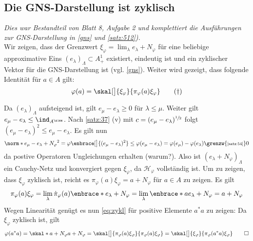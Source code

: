 \subsection{Die GNS-Darstellung ist zyklisch} %
\label{sub:gns_zyklisch}
\emph{Dies war Bestandteil von Blatt 8, Aufgabe 2 und komplettiert die Ausführungen zur GNS-Darstellung in \autoref{gns} und \autoref{satz:512}).} \smallskip \\
Wir zeigen, dass der Grenzwert $\xi_\varphi = \lim_\lambda e_\lambda + N_\varphi$ für eine beliebige approximative Eins $(e_\lambda)_\Lambda \subset A^1_+$ existiert, eindeutig ist und ein zyklischer Vektor für die GNS-Darstellung ist (vgl. \autoref{gns}).
Weiter wird gezeigt, dass folgende Identität für $a \in A$ gilt:
\begin{equation}
	\varphi(a) = \skal[\big]{\xi_\varphi}{\pi_\varphi(a)\xi_\varphi}
	\label{eq:zykl} \tag{\dag}
\end{equation}
\begin{beweis}
	Da $(e_\lambda)_\Lambda$ aufsteigend ist, gilt $e_\mu - e_\lambda \ge 0$ für $\lambda \le \mu$. 
	Weiter gilt $e_\mu - e_\lambda \le \ind_{A^\simm}$.
	Nach \autoref{satz:37} (v) mit $c=(e_\mu -e_\lambda)^{\sfrac{1}{2}}$ folgt $(e_\mu -e_\lambda)^2 \le e_\mu -e_\lambda$.
	Es gilt nun
	\[
		\norm*{e_\mu - e_\lambda + N_\varphi}^2 = \varphi \enbrace[\big]{(e_\mu-e_\lambda)^2} \le \varphi(e_\mu -e_\lambda)= \varphi(e_\mu)- \varphi(e_\lambda)
		\grenzw{\mbox{\scriptsize\ref{satz:54}}} 0
	\]
	da postive Operatoren Ungleichungen erhalten (warum?).
	Also ist $(e_\lambda +N_\varphi)_\Lambda$ ein Cauchy-Netz und konvergiert gegen $\xi_\varphi$, da $\mathcal{H}_\varphi$ vollständig ist.
	Um zu zeigen, dass $\xi_\varphi$ zyklisch ist, reicht es $\pi_\varphi(a) \xi_\varphi = a + N_\varphi$ für $a \in A$ zu zeigen. Es gilt
	\[
		\pi_\varphi(a) \xi_\varphi = \lim_\lambda \dot{\pi}_\varphi(a) \enbrace*{e_\lambda +N_\varphi} = \lim_\lambda \enbrace*{a e_\lambda + N_\varphi} = a+ N_\varphi
	\]
	Wegen Linearität genügt es nun \eqref{eq:zykl} für positive Elemente $a^*a$ zu zeigen: 
	Da $\xi_\varphi$ zyklisch ist, gilt
	\[
		\varphi(a^*a) = \skal*{a+ N_\varphi}{a+N_\varphi} = \skal[\big]{\pi_\varphi(a) \xi_\varphi}{\pi_\varphi(a)\xi_\varphi} = \skal[\big]{\xi_\varphi}{\pi_\varphi(a^*a)\xi_\varphi}\qedhere
	\]
\end{beweis} 

